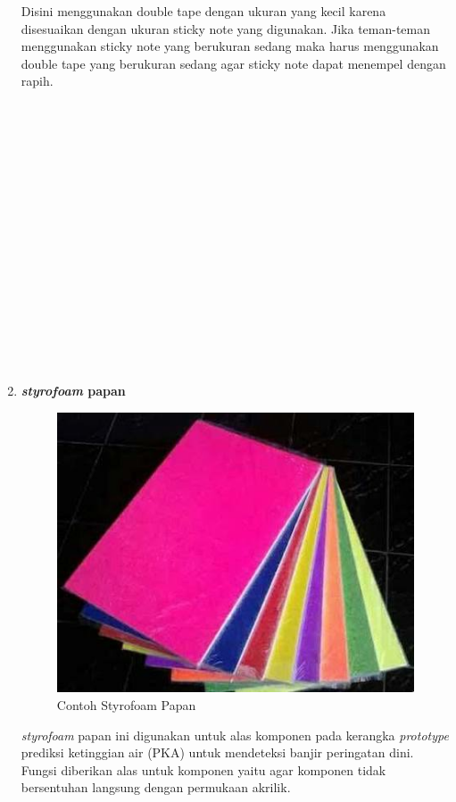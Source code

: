 \begin{enumerate}
\par Disini menggunakan double tape dengan ukuran yang kecil karena disesuaikan dengan ukuran sticky note yang digunakan. Jika teman-teman menggunakan sticky note yang berukuran sedang maka harus menggunakan double tape yang berukuran sedang agar sticky note dapat menempel dengan rapih.
\\
\\ 
\\ 
\\ \\ \\ \\ \\ \\  \\ \\ \\ \\ \\ \\ \\ \\  
\item \textbf{\textit{styrofoam} papan}
\begin{figure}[H]
\centering
\includegraphics[width=1\textwidth]{figures/sterofoam.png}
\caption{Contoh Styrofoam Papan}
\label{print}
\end{figure}

\par \textit{styrofoam} papan ini digunakan untuk alas komponen pada kerangka \textit{prototype} prediksi ketinggian air (PKA) untuk mendeteksi banjir peringatan dini. Fungsi diberikan alas untuk komponen yaitu agar komponen tidak bersentuhan langsung dengan permukaan akrilik.

\end{enumerate}

